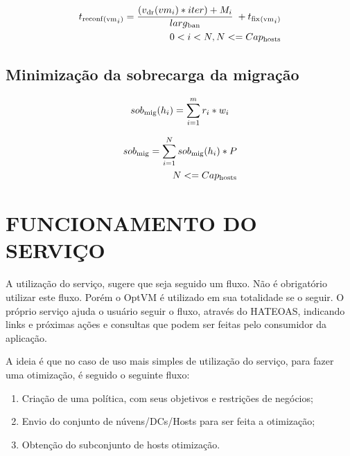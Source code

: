 \begin{equation}
\begin{split}
t\textsubscript{reconf}\textsubscript{(vm}_i\textsubscript{)} = \dfrac{ (v\textsubscript{dr}(vm_i) * iter) + M_i}{larg\textsubscript{ban}} \; + t\textsubscript{fix}\textsubscript{(vm}_i\textsubscript{)} \\
0<i<N, N <= Cap\textsubscript{hosts}
\end{split}
\label{eq:reconf}
\end{equation}

\subsection{Minimização da sobrecarga da migração}

\begin{equation}
sob\textsubscript{mig}(h_i) = \sum_{i=1}^{m}r_i * w_i
\label{eq:sobHi}
\end{equation}


\begin{equation}
\begin{split}
sob\textsubscript{mig} = \sum_{i=1}^{N}sob\textsubscript{mig}(h_i) * P  \\
N <= Cap\textsubscript{hosts}
\end{split}
\label{eq:sobrecarga}
\end{equation}

\section{FUNCIONAMENTO DO SERVIÇO}

A utilização do serviço, sugere que seja seguido um fluxo. Não é obrigatório
utilizar este fluxo. Porém o OptVM é utilizado em sua totalidade se o seguir. 
O próprio serviço ajuda o usuário seguir o fluxo, através do HATEOAS, indicando 
links e próximas ações e consultas que podem ser feitas pelo consumidor da aplicação.

A ideia é que no caso de uso mais simples de utilização do serviço, 
para fazer uma otimização, é seguido o seguinte fluxo:

\begin{enumerate}
 \item Criação de uma política, com seus objetivos e restrições de negócios;
 \item Envio do conjunto de núvens/DCs/Hosts para ser feita a otimização;
 \item Obtenção do subconjunto de hosts otimização.
\end{enumerate}

